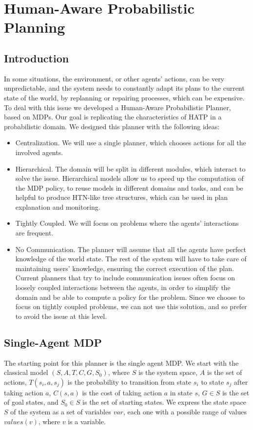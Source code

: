 \chapter{Human-Aware Probabilistic Planning}
\label{subsec:plan_management-happ}



\section{Introduction}
In some situations, the environment, or other agents' actions, can be very unpredictable, and the system needs to constantly adapt its plans to the current state of the world, by replanning or repairing processes, which can be expensive. To deal with this issue we developed a Human-Aware Probabilistic Planner, based on MDPs. Our goal is replicating the characteristics of HATP in a probabilistic domain. We designed this planner with the following ideas:

\begin{itemize}
\item Centralization. We will use a single planner, which chooses actions for all the involved agents.
\item Hierarchical. The domain will be split in different modules, which interact to solve the issue. Hierarchical models allow us to speed up the computation of the MDP policy, to reuse models in different domains and tasks, and can be helpful to produce HTN-like tree structures, which can be used in plan explanation and monitoring.
\item Tightly Coupled. We will focus on problems where the agents' interactions are frequent.
\item No Communication. The planner will  assume that all the agents have perfect knowledge of the world state. The rest of the system will have to take care of maintaining users' knowledge, ensuring the correct execution of the plan. Current planners that try to include communication issues often focus on loosely coupled interactions between the agents, in order to simplify the domain and be able to compute a policy for the problem. Since we choose to focus on tightly coupled problems, we can not use this solution, and so prefer to avoid the issue at this level.
\end{itemize}


\section{Single-Agent MDP}
The starting point for this planner is the single agent MDP. We start with the classical model $(S,A,T,C,G,S_0)$, where $S$ is the system space, $A$ is the set of actions, $T(s_i,a,s_j)$ is the probability to transition from state $s_i$ to state $s_j$ after taking action $a$, $C(s,a)$ is the cost of taking action $a$ in state $s$, $G \in S$ is the set of goal states, and $S_0 \in S$ is the set of starting states. We express the state space $S$ of the system as a set of variables $var$, each one with a possible range of values $values(v)$, where $v$ is a variable.

